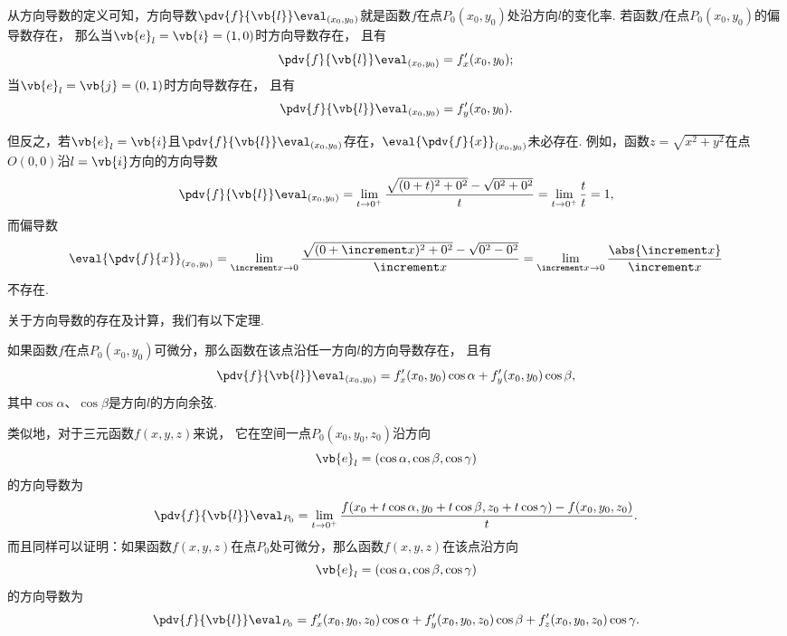 从方向导数的定义可知，方向导数\(\pdv{f}{\vb{l}}\eval_{(x_0,y_0)}\)就是函数\(f\)在点\(P_0(x_0,y_0)\)处沿方向\(l\)的变化率.
若函数\(f\)在点\(P_0(x_0,y_0)\)的偏导数存在，
那么当\(\vb{e}_l = \vb{i} = (1,0)\)时方向导数存在，
且有\begin{equation*}
	\pdv{f}{\vb{l}}\eval_{(x_0,y_0)} = f'_x(x_0,y_0);
\end{equation*}
当\(\vb{e}_l = \vb{j} = (0,1)\)时方向导数存在，
且有\begin{equation*}
	\pdv{f}{\vb{l}}\eval_{(x_0,y_0)} = f'_y(x_0,y_0).
\end{equation*}

但反之，若\(\vb{e}_l = \vb{i}\)且\(\pdv{f}{\vb{l}}\eval_{(x_0,y_0)}\)存在，\(\eval{\pdv{f}{x}}_{(x_0,y_0)}\)未必存在.
例如，函数\(z = \sqrt{x^2+y^2}\)在点\(O(0,0)\)沿\(l = \vb{i}\)方向的方向导数\begin{equation*}
	\pdv{f}{\vb{l}}\eval_{(x_0,y_0)}
	= \lim_{t\to0^+} \frac{\sqrt{(0+t)^2+0^2}-\sqrt{0^2+0^2}}{t}
	= \lim_{t\to0^+} \frac{t}{t} = 1,
\end{equation*}
而偏导数\begin{equation*}
	\eval{\pdv{f}{x}}_{(x_0,y_0)}
	= \lim_{\increment x\to0} \frac{\sqrt{(0+\increment x)^2+0^2}-\sqrt{0^2-0^2}}{\increment x}
	= \lim_{\increment x\to0} \frac{\abs{\increment x}}{\increment x}
\end{equation*}不存在.

关于方向导数的存在及计算，我们有以下定理.
\begin{theorem}[充分条件]
如果函数\(f\)在点\(P_0(x_0,y_0)\)可微分，那么函数在该点沿任一方向\(l\)的方向导数存在，
且有\begin{equation*}
	\pdv{f}{\vb{l}}\eval_{(x_0,y_0)}
	=f'_x(x_0,y_0) \cos\alpha + f'_y(x_0,y_0) \cos\beta,
\end{equation*}
其中\(\cos\alpha\)、\(\cos\beta\)是方向\(l\)的方向余弦.
\end{theorem}

类似地，对于三元函数\(f(x,y,z)\)来说，
它在空间一点\(P_0(x_0,y_0,z_0)\)沿方向\begin{equation*}
	\vb{e}_l = (\cos\alpha,\cos\beta,\cos\gamma)
\end{equation*}的方向导数为\begin{equation*}
	\pdv{f}{\vb{l}}\eval_{P_0}
	= \lim_{t\to0^+}
	\frac{f(x_0+t\cos\alpha,y_0+t\cos\beta,z_0+t\cos\gamma)-f(x_0,y_0,z_0)}{t}.
\end{equation*}
而且同样可以证明：如果函数\(f(x,y,z)\)在点\(P_0\)处可微分，那么函数\(f(x,y,z)\)在该点沿方向\begin{equation*}
	\vb{e}_l = (\cos\alpha,\cos\beta,\cos\gamma)
\end{equation*}的方向导数为\begin{equation*}
\pdv{f}{\vb{l}}\eval_{P_0}
= f'_x(x_0,y_0,z_0) \cos\alpha + f'_y(x_0,y_0,z_0) \cos\beta + f'_z(x_0,y_0,z_0) \cos\gamma.
\end{equation*}


